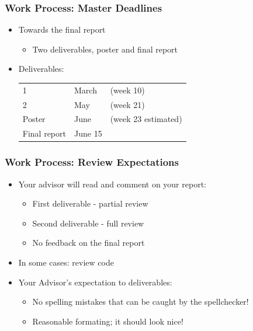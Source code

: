 \documentclass[hyperref={pdfpagelabels=false}, aspectratio=1610]{beamer}
\begin{document}
\begin{frame}
\frametitle{Work Process: Master Deadlines}
\begin{block}{}
 \begin{itemize}
  \item Towards the final report
  \begin{itemize}
  	\item Two deliverables, poster and final report
  \end{itemize}
  \item Deliverables:\\
  \begin{tabular}{lll}
  1 & March & (week 10) \\
  2 & May & (week 21) \\
  Poster & June & (week 23 estimated) \\
  Final report & June 15 &  \\
  \end{tabular}
 \end{itemize}
\end{block}
\end{frame}

\begin{frame}
\frametitle{Work Process: Review Expectations}
\begin{block}{}
 \begin{itemize}
  \item Your advisor will read and comment on your report:
  \begin{itemize}
  	\item First deliverable - partial review
  	\item Second deliverable - full review
	\item No feedback on the final report
  \end{itemize}
  \item In some cases: review code
  \item Your Advisor's expectation to deliverables:
  \begin{itemize}
  	\item No spelling mistakes that can be caught by the spellchecker!
	\item Reasonable formating; it should look nice!
  \end{itemize}
 \end{itemize}
\end{block}
\end{frame}
\end{document}
